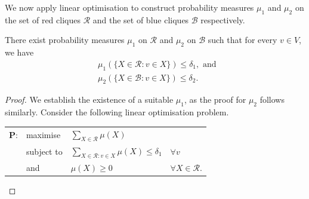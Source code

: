 \documentclass[12pt,a4paper]{article}
\begin{document}
We now apply linear optimisation to construct probability measures $\mu_1$ and $\mu_2$ on the set of red cliques $\mathcal{R}$ and the set of blue cliques $\mathcal{B}$ respectively.

\begin{lemma} \label{lem:mu_existence}
    There exist probability measures $\mu_1$ on $\mathcal{R}$ and $\mu_2$ on $\mathcal{B}$ such that for every $v \in V$, we have
    \begin{align*}
        &\mu_1(\{X \in \mathcal{R}: v \in X\}) \leq \delta_1, \text{ and } \\
       &\mu_2(\{X \in \mathcal{B}: v \in X\}) \leq \delta_2.
    \end{align*}
\end{lemma}

\begin{proof}
    We establish the existence of a suitable $\mu_1$, as the proof for $\mu_2$ follows similarly. Consider the following linear optimisation problem.
    \begin{center}
    \setlength{\tabcolsep}{15pt} %
    \renewcommand{\arraystretch}{1.2} %
    \begin{tabular}{l l l l}
        $\mathbf{P}$: & maximise & $\sum_{X \in \mathcal{R}} \mu(X)$ \\
        & subject to & $\sum_{X \in \mathcal{R}: v \in X} \mu(X) \leq \delta_1$ & $\forall v$ \\
        & and & $\mu(X) \geq 0$ & $\forall X \in \mathcal{R}$. 
    \end{tabular}
    \end{center}


\end{proof}
\end{document}
